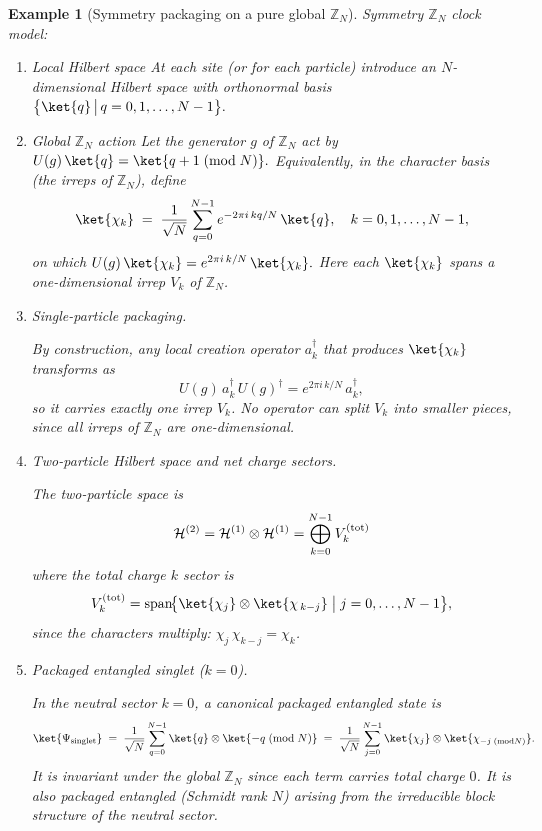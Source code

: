 \documentclass[12pt,a4paper]{article}
\newtheorem{example}{Example}
\begin{document}
\begin{example}[Symmetry packaging on a pure global $\mathbb Z_N$]
	Symmetry $\mathbb Z_N$ clock model:
	
	\begin{enumerate}
		\item Local Hilbert space
		At each site (or for each particle) introduce an $N$-dimensional Hilbert space with orthonormal basis		
		$
		\bigl\{\ket{q}\,\big|\,q=0,1,\dots,N-1\bigr\}.
		$
		
		\item Global $\mathbb Z_N$ action
		Let the generator $g$ of $\mathbb Z_N$ act by		
		$
		U(g)\,\ket{q}
		= \ket{q+1 \;(\mathrm{mod}\;N)}.
		$		
		Equivalently, in the character basis (the irreps of $\mathbb Z_N$), define
		$$
		\ket{\chi_k}
		\;=\;\frac{1}{\sqrt{N}}\sum_{q=0}^{N-1}e^{-2\pi i\,kq/N}\,\ket{q},
		\quad k=0,1,\dots,N-1,
		$$		
		on which		
		$
		U(g)\,\ket{\chi_k}
		= e^{2\pi i\,k/N}\,\ket{\chi_k}.
		$	
		Here each $\ket{\chi_k}$ spans a one-dimensional irrep $V_k$ of $\mathbb Z_N$.
		
		
		\item Single-particle packaging.
		
		By construction, any local creation operator $a^\dagger_k$ that produces $\ket{\chi_k}$ transforms as		
		$$
		U(g)\,a^\dagger_k\,U(g)^\dagger
		= e^{2\pi i\,k/N}\,a^\dagger_k,
		$$		
		so it carries exactly one irrep $V_k$.
		No operator can split $V_k$ into smaller pieces, since all irreps of $\mathbb Z_N$ are one-dimensional.
		
		
		\item Two-particle Hilbert space and net charge sectors.
		
		The two-particle space is		
		$$
		\mathcal H^{(2)}
		= \mathcal H^{(1)}\otimes\mathcal H^{(1)}
		= \bigoplus_{k=0}^{N-1} V_k^{(\rm tot)}
		$$		
		where the total charge $k$ sector is		
		$$
		V_k^{(\rm tot)}
		= \operatorname{span}\!\bigl\{
		\ket{\chi_j}\otimes\ket{\chi_{\,k-j}} \;\big|\;j=0,\dots,N-1
		\bigr\},
		$$		
		since the characters multiply:
		$\chi_j\,\chi_{k-j}=\chi_k$.
		
		
		\item Packaged entangled singlet ($k=0$).
		
		In the neutral sector $k=0$, a canonical packaged entangled state is		
		$$
		\ket{\Psi_{\rm singlet}}
		\;=\;\frac{1}{\sqrt{N}}
		\sum_{q=0}^{N-1}
		\ket{q}\otimes\ket{-q\;(\mathrm{mod}\;N)}
		\;=\;
		\frac{1}{\sqrt{N}}
		\sum_{j=0}^{N-1}
		\ket{\chi_j}\otimes\ket{\chi_{-j\;(\mathrm{mod}N)}}.
		$$
		It is invariant under the global $\mathbb Z_N$ since each term carries total charge $0$.
		It is also packaged entangled (Schmidt rank $N$) arising from the irreducible block structure of the neutral sector.
	\end{enumerate}
\end{example}
\end{document}
